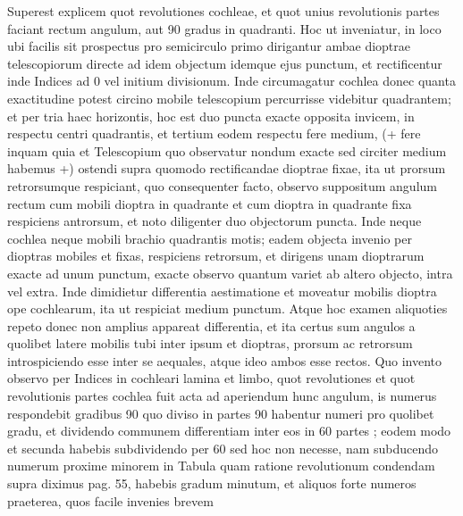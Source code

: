 \pstart Superest explicem quot revolutiones cochleae, et quot unius revolutionis partes faciant rectum angulum, aut 90 gradus in quadranti\protect{}. Hoc ut inveniatur, in loco ubi facilis sit prospectus pro semicirculo primo dirigantur ambae dioptrae\protect{} telescopiorum\protect{} directe ad idem objectum idemque ejus punctum, et rectificentur inde Indices ad 0 vel initium divisionum. Inde circumagatur cochlea donec quanta exactitudine  potest circino mobile telescopium\protect{} percurrisse videbitur quadrantem\protect{}; et per tria haec  horizontis, hoc est duo puncta exacte opposita invicem, in respectu centri quadrantis\protect{}, et tertium eodem respectu fere medium, (+ fere inquam quia et Telescopium\protect{} quo observatur nondum exacte sed circiter medium habemus +) ostendi supra quomodo rectificandae dioptrae\protect{} fixae, ita ut prorsum retrorsumque respiciant, quo consequenter facto, observo suppositum angulum rectum cum mobili dioptra\protect{} in quadrante\protect{} et cum dioptra\protect{} in quadrante\protect{} fixa respiciens antrorsum, et noto diligenter duo objectorum puncta. Inde neque cochlea neque mobili brachio quadrantis\protect{} motis; eadem objecta invenio per dioptras\protect{} mobiles et fixas, respiciens retrorsum, et dirigens unam dioptrarum\protect{} exacte ad unum punctum, exacte observo quantum variet ab altero objecto, intra vel extra. Inde dimidietur differentia aestimatione et moveatur mobilis dioptra\protect{} ope cochlearum, ita ut respiciat medium punctum. Atque hoc examen aliquoties repeto donec non amplius appareat differentia, et ita certus sum angulos a quolibet latere mobilis tubi inter ipsum et dioptras\protect{}, prorsum ac retrorsum introspiciendo esse inter se aequales, atque ideo ambos esse rectos. Quo invento observo per Indices in cochleari lamina et limbo, quot revolutiones et quot revolutionis partes cochlea fuit acta ad aperiendum hunc angulum, is numerus respondebit gradibus 90 quo diviso in partes 90 habentur numeri pro quolibet gradu, et dividendo communem differentiam inter eos in 60 partes ; eodem modo et secunda habebis subdividendo per 60 sed hoc non necesse, nam subducendo numerum proxime minorem in Tabula quam ratione revolutionum condendam supra diximus pag. 55, habebis gradum minutum, et aliquos forte numeros praeterea, quos facile invenies  brevem 